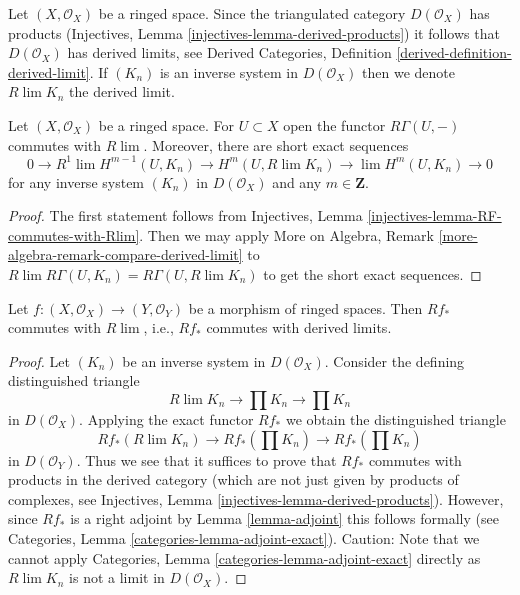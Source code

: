 \noindent
Let $(X, \mathcal{O}_X)$ be a ringed space. Since the triangulated category
$D(\mathcal{O}_X)$ has products
(Injectives, Lemma \ref{injectives-lemma-derived-products})
it follows that $D(\mathcal{O}_X)$ has derived limits, see
Derived Categories, Definition \ref{derived-definition-derived-limit}.
If $(K_n)$ is an inverse system in $D(\mathcal{O}_X)$ then we
denote $R\lim K_n$ the derived limit.

\begin{lemma}
\label{lemma-RGamma-commutes-with-Rlim}
Let $(X, \mathcal{O}_X)$ be a ringed space. For $U \subset X$ open the
functor $R\Gamma(U, -)$ commutes with $R\lim$. Moreover, there are
short exact sequences
$$
0 \to
R^1\lim H^{m - 1}(U, K_n) \to H^m(U, R\lim K_n) \to
\lim H^m(U, K_n) \to 0
$$
for any inverse system $(K_n)$ in $D(\mathcal{O}_X)$ and any $m \in \mathbf{Z}$.
\end{lemma}

\begin{proof}
The first statement follows from
Injectives, Lemma \ref{injectives-lemma-RF-commutes-with-Rlim}.
Then we may apply 
More on Algebra, Remark \ref{more-algebra-remark-compare-derived-limit}
to $R\lim R\Gamma(U, K_n) = R\Gamma(U, R\lim K_n)$ to get the short
exact sequences.
\end{proof}

\begin{lemma}
\label{lemma-Rf-commutes-with-Rlim}
Let $f : (X, \mathcal{O}_X) \to (Y, \mathcal{O}_Y)$ be a morphism of ringed
spaces. Then $Rf_*$ commutes with $R\lim$, i.e., $Rf_*$ commutes with
derived limits.
\end{lemma}

\begin{proof}
Let $(K_n)$ be an inverse system in $D(\mathcal{O}_X)$. Consider the defining
distinguished triangle
$$
R\lim K_n \to \prod K_n \to \prod K_n
$$
in $D(\mathcal{O}_X)$. Applying the exact functor $Rf_*$ we obtain
the distinguished triangle
$$
Rf_*(R\lim K_n) \to Rf_*\left(\prod K_n\right) \to Rf_*\left(\prod K_n\right)
$$
in $D(\mathcal{O}_Y)$. Thus we see that it suffices to prove that
$Rf_*$ commutes with products in the derived category (which are not just
given by products of complexes, see
Injectives, Lemma \ref{injectives-lemma-derived-products}).
However, since $Rf_*$ is a right adjoint by Lemma \ref{lemma-adjoint}
this follows formally (see
Categories, Lemma \ref{categories-lemma-adjoint-exact}).
Caution: Note that we cannot apply
Categories, Lemma \ref{categories-lemma-adjoint-exact}
directly as $R\lim K_n$ is not a limit in $D(\mathcal{O}_X)$.
\end{proof}

